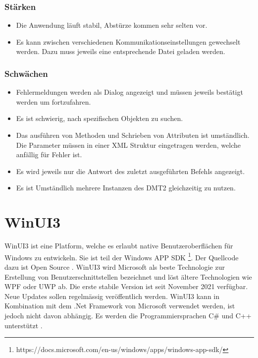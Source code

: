 \subsubsection{Stärken}
\begin{itemize}
   \item Die Anwendung läuft stabil, Abstürze kommen sehr selten vor.
   \item Es kann zwischen verschiedenen Kommunikationseinstellungen gewechselt werden. Dazu muss jeweils eine entsprechende Datei geladen werden.
\end{itemize}

\subsubsection{Schwächen}
\begin{itemize}
   \item Fehlermeldungen werden als Dialog angezeigt und müssen jeweils bestätigt werden um fortzufahren.
   \item Es ist schwierig, nach spezifischen Objekten zu suchen.
   \item Das ausführen von Methoden und Schrieben von Attributen ist umständlich. Die Parameter müssen in einer XML Struktur eingetragen werden, welche anfällig für Fehler ist.
   \item Es wird jeweils nur die Antwort des zuletzt ausgeführten Befehls angezeigt.
   \item Es ist Umständlich mehrere Instanzen des \ac{DMT2} gleichzeitig zu nutzen. 
\end{itemize}


\section{WinUI3}
WinUI3 ist eine Platform, welche es erlaubt native Benutzeroberflächen für Windows zu entwickeln.
Sie ist teil der Windows APP SDK \footnote{https://docs.microsoft.com/en-us/windows/apps/windows-app-sdk/}.
Der Quellcode dazu ist Open Source \parencite{winuiintro}.
WinUI3 wird Microsoft als beste Technologie zur Erstellung von Benutzerschnittstellen bezeichnet und löst ältere Technologien wie \ac{WPF} oder \ac{UWP} ab.
Die erste stabile Version ist seit November 2021 verfügbar.
Neue Updates sollen regelmässig veröffentlich werden.
WinUI3 kann in Kombination mit dem .Net Framework von Microsoft verwendet werden, ist jedoch nicht davon abhängig.
Es werden die Programmiersprachen C\# und C++ unterstützt \parencite{winuiroadmap}.


\pagebreak

\pagebreak



